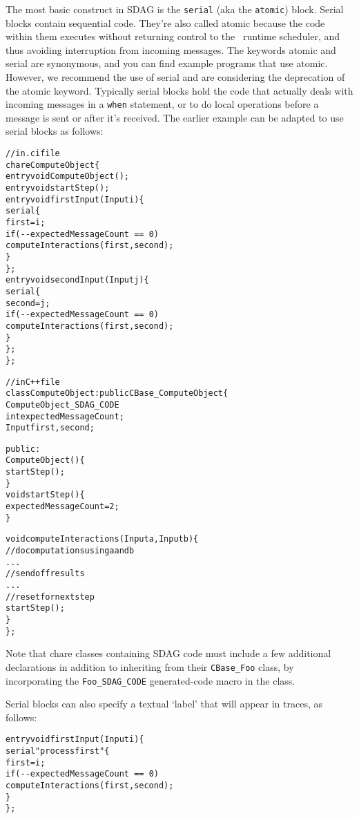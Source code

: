 The most basic construct in SDAG is the {\tt serial} (aka the {\tt atomic}) block.
Serial blocks
contain sequential \CC code.  They're also called atomic because the code within
them executes without returning control to the \charmpp\ runtime scheduler, and
thus avoiding interruption from incoming messages. The keywords atomic and serial
are synonymous, and you can find example programs that use atomic. However, we
recommend the use of serial and are considering the deprecation of the atomic keyword.
Typically serial blocks hold
the code that actually deals with incoming messages in a {\tt when} statement,
or to do local operations before a message is sent or after it's received. The
earlier example can be adapted to use serial blocks as follows:
\begin{center}
\begin{alltt}
// in .ci file
chare ComputeObject \{
  entry void ComputeObject();
  entry void startStep();
  entry void firstInput(Input i) \{
    serial \{
      first = i;
      if (\verb|--expectedMessageCount == 0|)
        computeInteractions(first, second);
    \}
  \};
  entry void secondInput(Input j) \{
    serial \{
      second = j;
      if (\verb|--expectedMessageCount == 0|)
        computeInteractions(first, second);
    \}
  \};
\};

// in C++ file
class ComputeObject : public CBase\_ComputeObject \{
  ComputeObject\_SDAG\_CODE
  int   expectedMessageCount;
  Input first, second;

public:
  ComputeObject() \{
    startStep();
  \}
  void startStep() \{
    expectedMessageCount = 2;
  \}

  void computeInteractions(Input a, Input b) \{
    // do computations using a and b
    . . .
    // send off results
    . . .
    // reset for next step
    startStep();
  \}
\};
\end{alltt}
\end{center}
Note that chare classes containing SDAG code must include a few additional declarations
in addition to inheriting from their {\tt CBase\_Foo} class, by incorporating the
{\tt Foo\_SDAG\_CODE} generated-code macro in the class.

Serial blocks can also specify a textual `label' that will appear in traces, as
follows:
\begin{center}
\begin{alltt}
  entry void firstInput(Input i) \{
    serial "process first" \{
      first = i;
      if (\verb|--expectedMessageCount == 0|)
        computeInteractions(first, second);
    \}
  \};
\end{alltt}
\end{center}

